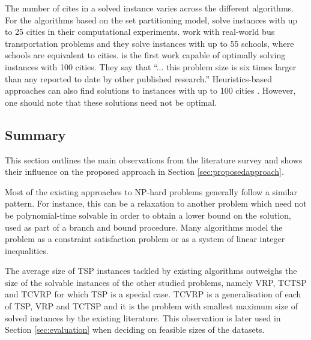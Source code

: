 \documentclass{mprop}
\theoremstyle{definition}
\begin{document}
The number of cites in a solved instance varies across the different algorithms. For the algorithms based on the set partitioning model, \citet{Agarwal89} solve instances with up to 25 cities in their computational experiments. \citet{Desrosiers84} work with real-world bus transportation problems and they solve instances with up to 55 schools, where schools are equivalent to cities. \citet{Desrochers92} is the first work capable of optimally solving instances with 100 cities. They say that ``... this problem size is six times larger than any reported to date by other published research.''
Heuristics-based approaches can also find solutions to instances with up to 100 cities \citep{Tan99heuristicmethods}. However, one should note that these solutions need not be optimal.


\subsection{Summary}

This section outlines the main observations from the literature survey and shows their influence on the proposed approach in Section \ref{sec:proposedapproach}.

Most of the existing approaches to NP-hard problems generally follow a similar pattern. For instance, this can be a relaxation to another problem which need not be polynomial-time solvable in order to obtain a lower bound on the solution, used as part of a branch and bound procedure. Many algorithms model the problem as a constraint satisfaction problem or as a system of linear integer inequalities.

The average size of TSP instances tackled by existing algorithms outweighs the size of the solvable instances of the other studied problems, namely VRP, TCTSP and TCVRP for which TSP is a special case. TCVRP is a generalisation of each of TSP, VRP and TCTSP and it is the problem with smallest maximum size of solved instances by the existing literature. This observation is later used in Section \ref{sec:evaluation} when deciding on feasible sizes of the datasets.
\end{document}
